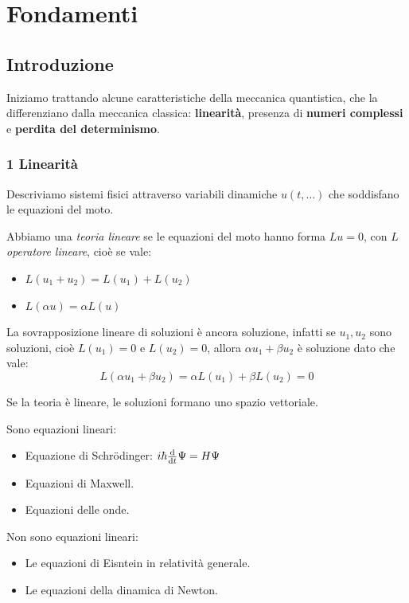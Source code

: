 
\chapter{Fondamenti}

\section{Introduzione}


Iniziamo trattando alcune caratteristiche della meccanica quantistica, 
che la differenziano dalla meccanica classica: \textbf{linearità}, presenza di \textbf{numeri complessi} e \textbf{perdita del determinismo}.


\subsection*{1 Linearità}

Descriviamo sistemi fisici attraverso variabili dinamiche \(u(t,\dots)\) che soddisfano le equazioni del moto.
\begin{definition}
    Abbiamo una \textit{teoria lineare} se le equazioni del moto hanno forma \(L u=0\), con \(L \) \textit{operatore lineare}, 
    cioè se vale:
    \begin{itemize}
        \item \(L(u_1+u_2)= L(u_1)+L(u_2)\)
        \item \(L(\alpha u)= \alpha L (u)\)
    \end{itemize}
\end{definition}

\begin{remark}
    La sovrapposizione lineare di soluzioni è ancora soluzione, infatti
    se \(u_1,u_2\) sono soluzioni, cioè \(L(u_1)=0\) e \(L(u_2)=0\), allora \(\alpha u_1+\beta u_2\) è soluzione dato che vale:
    \[L(\alpha u_1+\beta u_2)= \alpha L(u_1)+ \beta L(u_2)=0
    \] 
\end{remark}
\begin{remark}
    Se la teoria è lineare, le soluzioni formano uno spazio vettoriale.
\end{remark}    

\begin{example}
    Sono equazioni lineari:
    \begin{itemize}
        \item Equazione di Schrödinger: \(i\hbar \dv{t}\Psi= H \Psi\)
        \item Equazioni di Maxwell.
        \item Equazioni delle onde.
    \end{itemize}
\end{example}
\begin{example}
    Non sono equazioni lineari:
    \begin{itemize}
        \item Le equazioni di Eisntein in relatività generale.
        \item Le equazioni della dinamica di Newton.
    \end{itemize}
\end{example}


